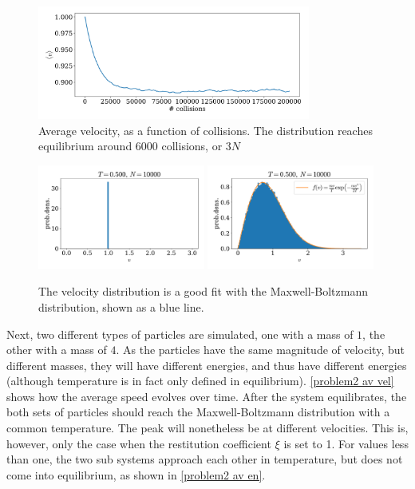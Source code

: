 \documentclass{article}
\begin{document}
    \begin{figure}[H]
        \centering
        \includegraphics[width=0.8\textwidth]{../plots/problem1/v_av.pdf}
        \caption{Average velocity, as a function of collisions. The distribution reaches equilibrium around $6000$ collisions, or $3N$}
        \label{problem1 av vel}
    \end{figure}
    
    \begin{figure}[H]
        \centering
        \includegraphics[width=0.49\textwidth]{../plots/problem1/2/vel_dist.pdf}
        \includegraphics[width=0.49\textwidth]{../plots/problem1/vel_dist.pdf}
        \caption{The velocity distribution is a good fit with the Maxwell-Boltzmann distribution, shown as a blue line.}
        \label{problem1 dist}
    \end{figure}

    Next, two different types of particles are simulated, one with a mass of $1$, the other with a mass of $4$. As the particles have the same magnitude of velocity, but different masses, they will have different energies, and thus have different energies (although temperature is in fact only defined in equilibrium). \autoref{problem2 av vel} shows how the average speed evolves over time. After the system equilibrates, the both sets of particles should reach the Maxwell-Boltzmann distribution with a common temperature. The peak will nonetheless be at different velocities. This is, however, only the case when the restitution coefficient $\xi$ is set to 1. For values less than one, the two sub systems approach each other in temperature, but does not come into equilibrium, as shown in \autoref{problem2 av en}.
\end{document}
